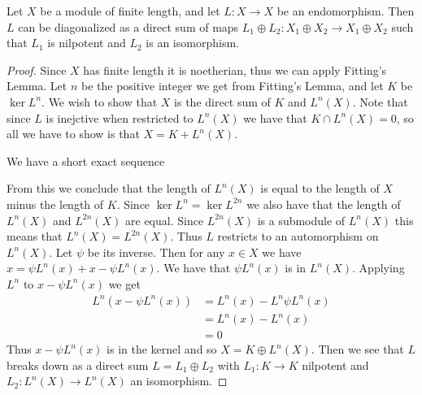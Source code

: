 \begin{cor}\label{cor:fittings_lemma_artin}
	Let $X$ be a module of finite length, and let $L\colon X\to X$ be an endomorphism. Then $L$ can be diagonalized as a direct sum of maps $L_1 \oplus L_2 \colon X_1 \oplus X_2 \to X_1 \oplus X_2$ such that $L_1$ is nilpotent and $L_2$ is an isomorphism.
	\begin{proof}
		Since $X$ has finite length it is noetherian, thus we can apply Fitting's Lemma. Let $n$ be the positive integer we get from Fitting's Lemma, and let $K$ be $\ker L^{n}$. We wish to show that $X$ is the direct sum of $K$ and $L^n(X)$. Note that since $L$ is inejctive when restricted to $L^n(X)$ we have that $K \cap L^n(X)=0$, so all we have to show is that $X = K + L^n(X)$.
	
		We have a short exact sequence
		\begin{center}
		\end{center}
		From this we conclude that the length of $L^{n}(X)$ is equal to the length of $X$ minus the length of $K$. Since $\ker L^n = \ker L^{2n}$ we also have that the length of $L^n(X)$ and $L^{2n}(X)$ are equal. Since $L^{2n}(X)$ is a submodule of $L^n(X)$ this means that $L^n(X)=L^{2n}(X)$. Thus $L$ restricts to an automorphism on $L^n(X)$. Let $\psi$ be its inverse. Then for any $x \in X$ we have $x = \psi L^n(x) + x - \psi L^n(x)$. We have that $\psi L^n(x)$ is in $L^n(X)$. Applying $L^n$ to $x-\psi L^n(x)$ we get
		\begin{align*}
			L^n(x-\psi L^n(x)) &= L^n(x) - L^n \psi L^n (x)\\
			&= L^n(x) - L^n(x)\\
			&= 0
		\end{align*}
		Thus $ x - \psi L^n(x)$ is in the kernel and so $X = K \oplus L^n(X)$. Then we see that $L$ breaks down as a direct sum $L = L_1 \oplus L_2$ with $L_1\colon K \to K$ nilpotent and $L_2 \colon L^n(X) \to L^n(X)$ an isomorphism.
	\end{proof}
\end{cor}